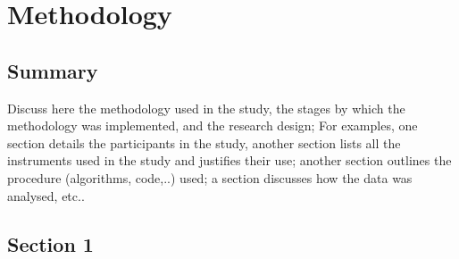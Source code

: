 
\chapter{Methodology}
\label{chap:third}
\ifpdf
    \graphicspath{{Chapter3/Figures/PNG/}{Chapter3/Figures/PDF/}{Chapter3/Figures/}}
\else
    \graphicspath{{Chapter3/Figures/EPS/}{Chapter3/Figures/}}
\fi


\section*{Summary}
Discuss here the methodology used in the study, the stages by which the methodology was implemented, and the research design; For examples, one section details the participants in the study, another section lists all the instruments used in the study and justifies their use; another section outlines the procedure (algorithms, code,..) used; a section discusses how the data was analysed, etc..


\section{Section 1} 
\label{sec:gv1}
